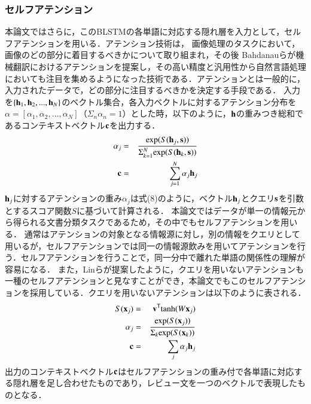 \documentclass[dvipdfmx,twocolumn,10.5pt]{jsarticle}
\begin{document}
\subsubsection{セルフアテンション}
本論文ではさらに，このBLSTMの各単語に対応する隠れ層を入力として，セルフアテンションを用いる．アテンション技術は， 画像処理のタスクにおいて，画像のどの部分に着目するべきかについて取り組まれ\cite{larochelle2010learning}，その後 Bahdanauらが機械翻訳におけるアテンションを提案し\cite{bahdanau2014neural}，その高い精度と汎用性から自然言語処理においても注目を集めるようになった技術である．アテンションとは一般的に，入力されたデータで，どの部分に注目するべきかを決定する手段である．
入力を$\{ {\bf h}_1, {\bf h}_2, ..., {\bf h}_N \}$のベクトル集合，各入力ベクトルに対するアテンション分布を$\alpha = [\alpha_1, \alpha_2, ..., \alpha_N]$（$\Sigma_n \alpha_n = 1$）とした時，以下のように，${\bf h}$の重みつき総和であるコンテキストベクトル${\bf c}$を出力する．
\begin{eqnarray}
  \alpha_j &=& \frac{{\rm exp}(S({\bf h}_j, {\bf s}))}{  \Sigma_{k=1}^N {\rm exp}(S({\bf h}_k, {\bf s}))  } \\
  {\bf c} &=& \sum_{j=1}^N \alpha_j {\bf h}_j
\end{eqnarray}
${\bf h}_j$に対するアテンションの重み$\alpha_j$は式(8)のように，ベクトル${\bf h}_j$とクエリ$\bf{s}$を引数とするスコア関数$S$に基づいて計算される．
本論文ではデータが単一の情報元から得られる文書分類タスクであるため，その中でもセルフアテンションを用いる．
通常はアテンションの対象となる情報源に対し，別の情報をクエリとして用いるが，セルフアテンションでは同一の情報源飲みを用いてアテンションを行う．セルフアテンションを行うことで，同一分中で離れた単語の関係性の理解が容易になる．
また，Linらが提案したように，クエリを用いないアテンションも一種のセルフアテンションと見なすことができ\cite{lin2017structured}，本論文でもこのセルフアテンションを採用している．クエリを用いないアテンションは以下のように表される．
\begin{eqnarray}
  S({\bf x}_j) &=& {\bf v}^\mathsf{T} {\rm tanh}(W{\bf x}_j) \\
  \alpha_j &=& \frac{{\rm exp}(S({\bf x}_j))}{  \Sigma_k{\rm exp}(S({\bf x}_k))  } \\
  {\bf c} &=& \sum_j \alpha_j {\bf h}_j
\end{eqnarray}
出力のコンテキストベクトル$\bf c$はセルフアテンションの重み付で各単語に対応する隠れ層を足し合わせたものであり，レビュー文を一つのベクトルで表現したものとなる．
\end{document}
